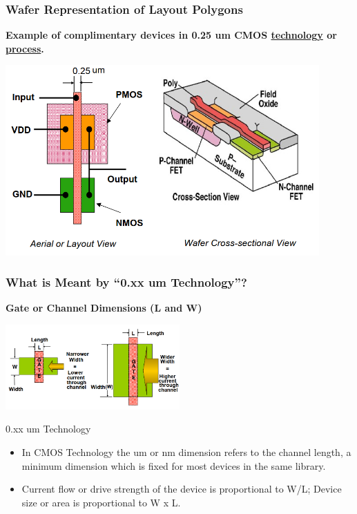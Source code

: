\documentclass[compress]{beamer}
\begin{document}
\begin{frame}
	\frametitle{Wafer Representation of Layout Polygons}
	\textbf{Example of complimentary devices in 0.25 um CMOS
	\underline{technology} or \underline{process}.}
	\begin{center}
		\includegraphics[width=0.9\textwidth]{Polygons}
	\end{center}
\end{frame}

\begin{frame}
	\frametitle{What is Meant by “0.xx um Technology”?}
	\textbf{Gate or Channel\underline{} Dimensions (L and W)}
		\begin{center}
		\includegraphics[width=0.5\textwidth]{Channel}
		\end{center}
	\begin{block}{0.xx um Technology}
		\begin{itemize}
			\item In CMOS Technology the um or nm dimension refers to the channel length,
			a minimum dimension which is fixed for most devices in the same library.
			\item Current flow or drive strength of the device is proportional to W/L;
			Device size or area is proportional to W x L.
		\end{itemize}
	\end{block}
\end{frame}
\end{document}
